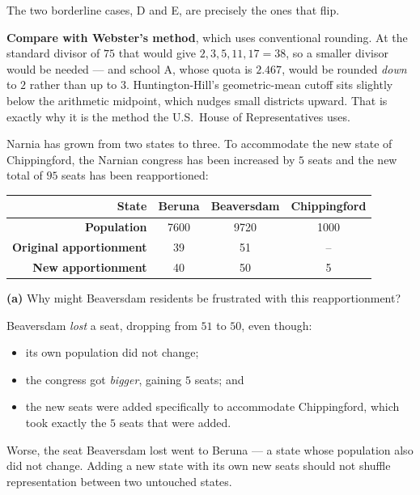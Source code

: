 \documentclass[12pt]{ximera}
\begin{document}
\begin{problem}
\begin{prompt}
\begin{feedback}
The two borderline cases, D and E, are precisely the ones that flip.

\textbf{Compare with Webster's method}, which uses conventional rounding. At the
standard divisor of $75$ that would give $2, 3, 5, 11, 17 = 38$, so a smaller divisor
would be needed --- and school A, whose quota is $2.467$, would be rounded \emph{down}
to $2$ rather than up to $3$. Huntington-Hill's geometric-mean cutoff sits slightly
below the arithmetic midpoint, which nudges small districts upward. That is exactly why
it is the method the U.S.\ House of Representatives uses.
\end{feedback}
\end{prompt}
\end{problem}

\begin{problem}
Narnia has grown from two states to three. To accommodate the new state of
Chippingford, the Narnian congress has been increased by $5$ seats and the new total of
$95$ seats has been reapportioned:

\begin{center}
\begin{tabular}{|r|c|c|c|}\hline
\textbf{State} & Beruna & Beaversdam & Chippingford \\\hline
\textbf{Population} & 7600 & 9720 & 1000 \\\hline
\textbf{Original apportionment} & 39 & 51 & -- \\\hline
\textbf{New apportionment} & 40 & 50 & 5 \\\hline
\end{tabular}
\end{center}

\begin{prompt}
\textbf{(a)} Why might Beaversdam residents be frustrated with this reapportionment?

\begin{freeResponse}
\end{freeResponse}

\begin{feedback}
Beaversdam \emph{lost} a seat, dropping from $51$ to $50$, even though:
\begin{itemize}
\item its own population did not change;
\item the congress got \emph{bigger}, gaining $5$ seats; and
\item the new seats were added specifically to accommodate Chippingford, which took
      exactly the $5$ seats that were added.
\end{itemize}
Worse, the seat Beaversdam lost went to Beruna --- a state whose population also did
not change. Adding a new state with its own new seats should not shuffle
representation between two untouched states.
\end{feedback}
\end{prompt}


\end{problem}
\end{document}
